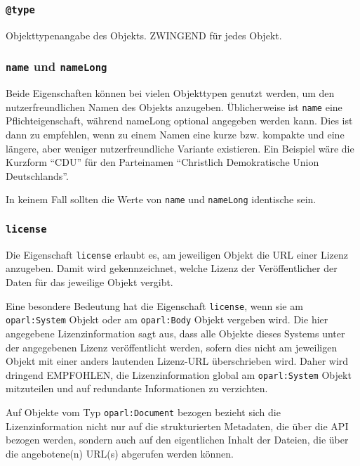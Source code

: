 \documentclass[,a4paper]{article}
\begin{document}
\subsubsection{\texttt{@type}}\label{type}

Objekttypenangabe des Objekts. ZWINGEND für jedes Objekt.

\subsubsection{\texttt{name} und
\texttt{nameLong}}\label{name-und-namelong}

Beide Eigenschaften können bei vielen Objekttypen genutzt werden, um den
nutzerfreundlichen Namen des Objekts anzugeben. Üblicherweise ist
\texttt{name} eine Pflichteigenschaft, während nameLong optional
angegeben werden kann. Dies ist dann zu empfehlen, wenn zu einem Namen
eine kurze bzw. kompakte und eine längere, aber weniger
nutzerfreundliche Variante existieren. Ein Beispiel wäre die Kurzform
``CDU'' für den Parteinamen ``Christlich Demokratische Union
Deutschlands''.

In keinem Fall sollten die Werte von \texttt{name} und \texttt{nameLong}
identische sein.

\subsubsection{\texttt{license}}\label{license}

Die Eigenschaft \texttt{license} erlaubt es, am jeweiligen Objekt die
URL einer Lizenz anzugeben. Damit wird gekennzeichnet, welche Lizenz der
Veröffentlicher der Daten für das jeweilige Objekt vergibt.

Eine besondere Bedeutung hat die Eigenschaft \texttt{license}, wenn sie
am \texttt{oparl:System} Objekt oder am \texttt{oparl:Body} Objekt
vergeben wird. Die hier angegebene Lizenzinformation sagt aus, dass alle
Objekte dieses Systems unter der angegebenen Lizenz veröffentlicht
werden, sofern dies nicht am jeweiligen Objekt mit einer anders
lautenden Lizenz-URL überschrieben wird. Daher wird dringend EMPFOHLEN,
die Lizenzinformation global am \texttt{oparl:System} Objekt mitzuteilen
und auf redundante Informationen zu verzichten.

Auf Objekte vom Typ \texttt{oparl:Document} bezogen bezieht sich die
Lizenzinformation nicht nur auf die strukturierten Metadaten, die über
die API bezogen werden, sondern auch auf den eigentlichen Inhalt der
Dateien, die über die angebotene(n) URL(s) abgerufen werden können.
\end{document}
